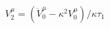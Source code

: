 \begin{equation} \label{l81-20}
V_2^{\mu}=(\ddot V_0^{\mu}-\kappa ^2 V_0^{\mu})/\kappa \tau _1
\end{equation}

